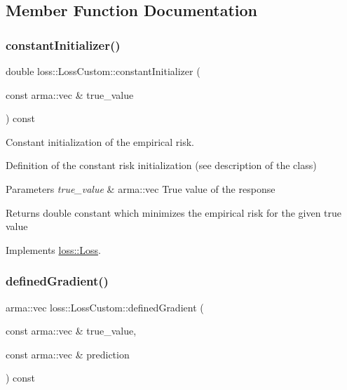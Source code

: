\subsection{Member Function Documentation}
\mbox{\label{classloss_1_1_loss_custom_a0c8abe2bf210898813d2f9e5049cc1e8}} 
\subsubsection{\texorpdfstring{constant\+Initializer()}{constantInitializer()}}
{\footnotesize\ttfamily double loss\+::\+Loss\+Custom\+::constant\+Initializer (\begin{DoxyParamCaption}\item[{const arma\+::vec \&}]{true\+\_\+value }\end{DoxyParamCaption}) const\hspace{0.3cm}{\ttfamily [virtual]}}



Constant initialization of the empirical risk. 

Definition of the constant risk initialization (see description of the class)


\begin{DoxyParams}{Parameters}
{\em true\+\_\+value} & {\ttfamily arma\+::vec} True value of the response\\
\hline
\end{DoxyParams}
\begin{DoxyReturn}{Returns}
{\ttfamily double} constant which minimizes the empirical risk for the given true value 
\end{DoxyReturn}


Implements \mbox{\hyperlink{classloss_1_1_loss_a65fe7dcd9370e6a549b8d1cc95fc8798}{loss\+::\+Loss}}.

\mbox{\label{classloss_1_1_loss_custom_a91761ef42f85914dde2c3e6dd7fa1a0c}} 
\subsubsection{\texorpdfstring{defined\+Gradient()}{definedGradient()}}
{\footnotesize\ttfamily arma\+::vec loss\+::\+Loss\+Custom\+::defined\+Gradient (\begin{DoxyParamCaption}\item[{const arma\+::vec \&}]{true\+\_\+value,  }\item[{const arma\+::vec \&}]{prediction }\end{DoxyParamCaption}) const\hspace{0.3cm}{\ttfamily [virtual]}}



